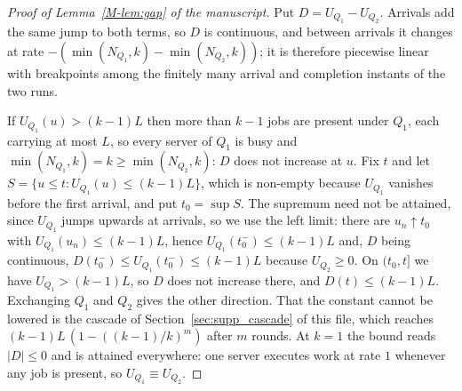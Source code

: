 \documentclass[mathematics,supfile,submit,moreauthors]{Definitions/mdpi}
\begin{document}
\begin{proof}[Proof of Lemma~\ref*{M-lem:gap} of the manuscript]
Put $D = U_{Q_1} - U_{Q_2}$. Arrivals add the same jump to both terms, so $D$ is
continuous, and between arrivals it changes at rate
$-(\min(N_{Q_1},k) - \min(N_{Q_2},k))$; it is therefore piecewise linear with
breakpoints among the finitely many arrival and completion instants of the two
runs.

If $U_{Q_1}(u) > (k-1)L$ then more than $k-1$ jobs are present under $Q_1$, each
carrying at most $L$, so every server of $Q_1$ is busy and
$\min(N_{Q_1},k) = k \ge \min(N_{Q_2},k)$: $D$ does not increase at $u$. Fix $t$
and let
$S = \{u \le t : U_{Q_1}(u) \le (k-1)L\}$, which is non-empty because $U_{Q_1}$
vanishes
before the first arrival, and put $t_0 = \sup S$. The supremum need not be
attained, since $U_{Q_1}$ jumps upwards at arrivals, so we use the left limit:
there are $u_n \uparrow t_0$ with $U_{Q_1}(u_n) \le (k-1)L$, hence
$U_{Q_1}(t_0^-) \le (k-1)L$ and, $D$ being continuous,
$D(t_0^-) \le U_{Q_1}(t_0^-) \le (k-1)L$ because $U_{Q_2} \ge 0$. On $(t_0, t]$
we have
$U_{Q_1} > (k-1)L$, so $D$ does not increase there, and $D(t) \le (k-1)L$.
Exchanging $Q_1$ and $Q_2$ gives the other direction. That the constant cannot be
lowered is the cascade of Section~\ref{sec:supp_cascade} of this file, which reaches
$(k-1)L\,(1 - ((k-1)/k)^m)$ after $m$ rounds. At $k = 1$ the bound reads
$|D| \le 0$ and is attained everywhere: one server executes work at rate $1$
whenever any job is present, so $U_{Q_1} \equiv U_{Q_2}$.
\end{proof}
\end{document}
